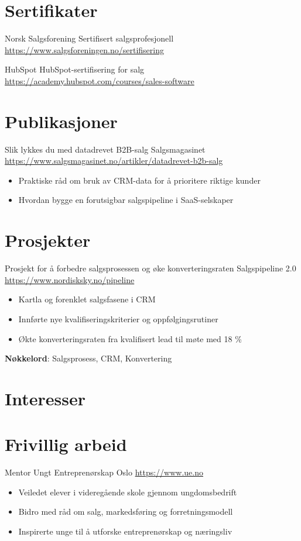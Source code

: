\documentclass[a4paper, serif, 10pt]{moderncv}
\begin{document}
\section{Sertifikater}

        {Norsk Salgsforening}
        {Sertifisert salgsprofesjonell}
        {\url{https://www.salgsforeningen.no/sertifisering}}
        {}
        {}

        {HubSpot}
        {HubSpot-sertifisering for salg}
        {\url{https://academy.hubspot.com/courses/sales-software}}
        {}
        {}
\section{Publikasjoner}

        {Slik lykkes du med datadrevet B2B-salg}
        {Salgsmagasinet}
        {\url{https://www.salgsmagasinet.no/artikler/datadrevet-b2b-salg}}
        {}
        {\begin{itemize}
\item Praktiske råd om bruk av CRM-data for å prioritere riktige kunder
\item Hvordan bygge en forutsigbar salgspipeline i SaaS-selskaper
\end{itemize}}
\section{Prosjekter}

        {Prosjekt for å forbedre salgsprosessen og øke konverteringsraten}
        {Salgspipeline 2.0}
        {\url{https://www.nordisksky.no/pipeline}}
        {}
        {\begin{itemize}
\item Kartla og forenklet salgsfasene i CRM
\item Innførte nye kvalifiseringskriterier og oppfølgingsrutiner
\item Økte konverteringsraten fra kvalifisert lead til møte med 18 \%
\end{itemize}
\textbf{Nøkkelord}: Salgsprosess, CRM, Konvertering}
\section{Interesser}

\section{Frivillig arbeid}

        {Mentor}
        {Ungt Entreprenørskap Oslo}
        {\url{https://www.ue.no}}
        {}
        {\begin{itemize}
\item Veiledet elever i videregående skole gjennom ungdomsbedrift
\item Bidro med råd om salg, markedsføring og forretningsmodell
\item Inspirerte unge til å utforske entreprenørskap og næringsliv
\end{itemize}}
    
\end{document}
